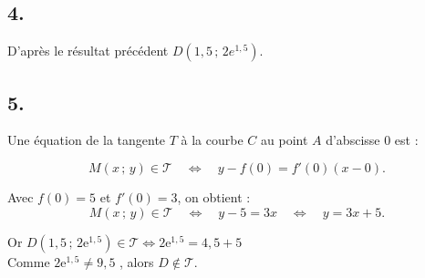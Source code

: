 \documentclass[10pt]{article}
\providecommand{\e}{{\mathrm{e}}}
\begin{document}
\subsection*{4.}

D'après le résultat précédent \(D\left(1,5\,;\,2 e^{1,5}\right)\).

\subsection*{5.}

Une équation de la tangente \(T\) à la courbe \(C\) au point \(A\) d'abscisse \(0\) est :

\[
M(x\,;\,y) \in \mathcal T \quad \Longleftrightarrow \quad y - f(0) = f'(0)(x - 0).
\]

Avec \(f(0) = 5\) et \(f'(0) = 3\), on obtient :
\[
M(x\,;\,y) \in \mathcal T \quad \iff \quad y - 5 = 3x \quad \iff \quad y = 3x + 5.
\]

Or $D\left(1,5\,;\,2 \e^{1,5}\right) \in \mathcal T \iff 2\e^{1,5} = 4,5 + 5 $\\
Comme $ 2 \e^{1,5} \neq 9,5$ , alors $ D \notin \mathcal T$.
\end{document}
